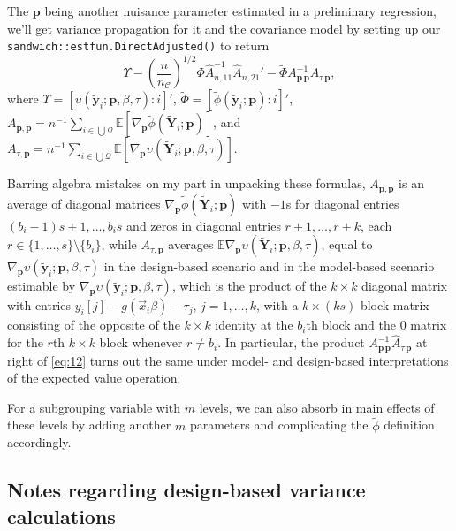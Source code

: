 \documentclass{article}
\begin{document}
The $\mathbf{p}$ being another nuisance parameter estimated in a
preliminary regression, we'll get variance propagation for it and the
covariance model by setting up our
\texttt{sandwich::estfun.DirectAdjusted()} to return
\begin{equation}\label{eq:12}
  \Upsilon -
  \left(\frac{n}{n_{\mathcal{C}}}\right)^{1/2}\Phi
  \hat{A}_{n,11}^{-1}\hat{A}_{n,21}' - \tilde{\Phi}
  A_{\mathbf{p}\,\mathbf{p}}^{-1}\hat{A}_{\tau\,\mathbf{p}}, 
\end{equation}
where $\Upsilon =
[\upsilon(\tilde{\mathbf{y}}_{i}; \mathbf{p}, \beta, \tau) : i]'$,
$\tilde{\Phi}= [\tilde{\phi}(\tilde{\mathbf{y}}_{i}; \mathbf{p}): i]'$, 
$A_{\mathbf{p}, \mathbf{p}} = n^{-1}\sum_{i\in \bigcup
  \mathcal{Q}}\mathbb{E} [\nabla_{\mathbf{p}}\tilde{\phi}(\tilde{\mathbf{Y}}_{i};
\mathbf{p})]$, and $A_{\tau, \mathbf{p}} = n^{-1} \sum_{i\in \bigcup
  \mathcal{Q}}\mathbb{E}[\nabla_{\mathbf{p}}\upsilon(\tilde{\mathbf{Y}}_{i};
\mathbf{p}, \beta, \tau)]$.

Barring algebra mistakes on my part in unpacking these formulas, $A_{\mathbf{p}, \mathbf{p}}$ is
an average of diagonal matrices $\nabla_{\mathbf{p}}\tilde{\phi}(\tilde{\mathbf{Y}}_{i};
\mathbf{p})$ with $-1$s for diagonal entries $(b_{i}-1)s+1, \ldots,
b_{i}s$ and zeros in diagonal entries $r+1, \ldots, r+k$, each
$r \in \{1, \ldots, s\}\setminus \{b_{i}\}$, while $A_{\tau,
  \mathbf{p}}$ averages $\mathbb{E} \nabla_{\mathbf{p}}\upsilon(\tilde{\mathbf{Y}}_{i};
\mathbf{p}, \beta, \tau)$, equal to $\nabla_{\mathbf{p}}\upsilon(\tilde{\mathbf{y}}_{i};
\mathbf{p}, \beta, \tau)$ in the design-based scenario and in the
model-based scenario estimable by $\nabla_{\mathbf{p}}\upsilon(\tilde{\mathbf{y}}_{i};
\mathbf{p}, \beta, \tau)$, which is the product of the $k \times k$
diagonal matrix with entries $y_{i}[j] - g(\vec{x}_{i}\beta) -
\tau_{j}$, $j=1, \ldots, k$, with a $k \times (ks)$ block matrix
consisting of the opposite of the $k\times k$ identity at the
$b_{i}$th block and the 0 matrix for the $r$th $k \times k$ block whenever
$r\neq b_{i}$.  In particular, the product
$A_{\mathbf{p}\,\mathbf{p}}^{-1}\hat{A}_{\tau\,\mathbf{p}}$ at right
of \eqref{eq:12} turns out the same under model- and design-based
interpretations of the expected value operation.

For a subgrouping variable with $m$ levels,
we can also absorb in main effects of these levels by adding another
$m$ parameters and complicating the $\tilde{\phi}$ definition accordingly. 


\subsection{Notes regarding design-based variance calculations}
\end{document}
